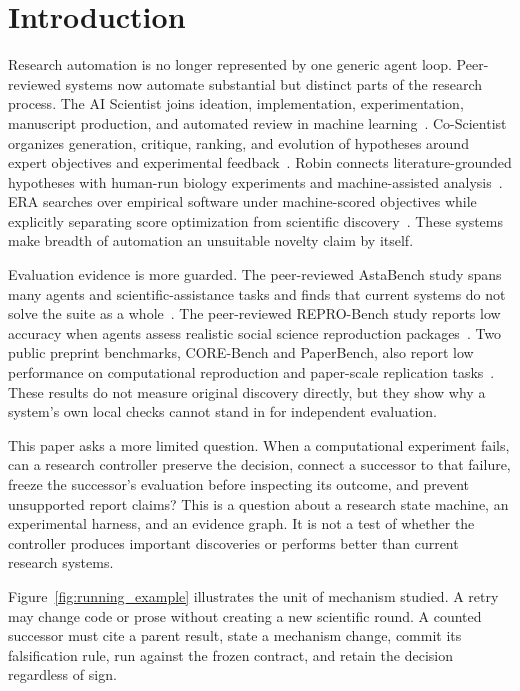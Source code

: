 \section{Introduction}
\label{sec:introduction}

Research automation is no longer represented by one generic agent loop.
Peer-reviewed systems now automate substantial but distinct parts of the
research process. The AI Scientist joins ideation, implementation,
experimentation, manuscript production, and automated review in machine
learning~\cite{lu2026aiscientist}. Co-Scientist organizes generation,
critique, ranking, and evolution of hypotheses around expert objectives and
experimental feedback~\cite{gottweis2026coscientist}. Robin connects
literature-grounded hypotheses with human-run biology experiments and
machine-assisted analysis~\cite{ghareeb2026robin}. ERA searches over
empirical software under machine-scored objectives while explicitly
separating score optimization from scientific discovery~\cite{aygun2026era}.
These systems make breadth of automation an unsuitable novelty claim by
itself.

Evaluation evidence is more guarded. The peer-reviewed AstaBench study spans
many agents and scientific-assistance tasks and finds that current systems do
not solve the suite as a whole~\cite{bragg2026astabench}. The peer-reviewed
REPRO-Bench study reports low accuracy when agents assess realistic social
science reproduction packages~\cite{hu2025reprobench}. Two public preprint
benchmarks, CORE-Bench and PaperBench, also report low performance on
computational reproduction and paper-scale replication
tasks~\cite{siegel2024corebench,starace2025paperbench}. These results do not
measure original discovery directly, but they show why a system's own local
checks cannot stand in for independent evaluation.

This paper asks a more limited question. When a computational experiment
fails, can a research controller preserve the decision, connect a successor
to that failure, freeze the successor's evaluation before inspecting its
outcome, and prevent unsupported report claims? This is a question about a
research state machine, an experimental harness, and an evidence graph. It is
not a test of whether the controller produces important discoveries or
performs better than current research systems.

Figure~\ref{fig:running_example} illustrates the unit of mechanism studied.
A retry may change code or prose without creating a new scientific round. A
counted successor must cite a parent result, state a mechanism change, commit
its falsification rule, run against the frozen contract, and retain the
decision regardless of sign.

